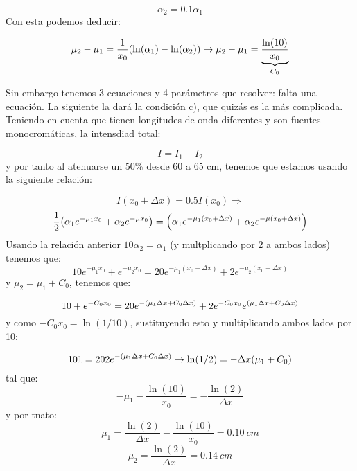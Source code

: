 \begin{equation}
    \alpha_2 = 0.1 \alpha_1
\end{equation}
Con esta podemos deducir: 

\begin{equation}
    \mu_2 - \mu_1 = \frac{1}{x_0} \pqty{\ln(\alpha_1)-\ln(\alpha_2)} \to \mu_2 - \mu_1 = \underbrace{\frac{\ln(10)}{x_0}}_{C_0}
\end{equation}

Sin embargo tenemos 3 ecuaciones y 4 parámetros que resolver: falta una ecuación. La siguiente la dará la condición c), que quizás es la más complicada. Teniendo en cuenta que tienen longitudes de onda diferentes y son fuentes monocromáticas, la intensdiad total: 

\begin{equation}
    I = I_1 + I_2 
\end{equation}
y por tanto al atenuarse un 50\% desde 60 a 65 cm, tenemos que estamos usando la siguiente relación: 

\begin{equation}
    I(x_0+\Delta x) = 0.5 I(x_0)  \Longrightarrow
\end{equation} 
\begin{equation}
    \frac{1}{2} \pqty{\alpha_1 e^{-\mu_1 x_0} + \alpha_2 e^{-\mu x_0}} = \pqty{\alpha_1 e^{-\mu_1 (x_0+\Delta x)} + \alpha_2 e^{-\mu (x_0+\Delta x)}}
\end{equation}
Usando la relación anterior  $10\alpha_2 = \alpha_1$ (y multplicando por 2 a ambos lados) tenemos que:
\begin{equation} 
    10e^{-\mu_1 x_0} + e^{-\mu_2 x_0} = 20 e^{-\mu_1 (x_0+\Delta x)} +2 e^{-\mu_2 (x_0+\Delta x)}
\end{equation}
y $\mu_2 = \mu_1 + C_0$, tenemos que: 

\begin{equation}
    10 + e^{-C_0 x_0} = 20 e^{-\pqty{\mu_1\Delta x+C_0 \Delta x}} +2 e^{-C_0x_0} e^{\pqty{\mu_1\Delta x+C_0 \Delta x}}
\end{equation}
y como $-C_0x_0=\ln(1/10)$, sustituyendo esto y multiplicando ambos lados por 10: 

\begin{equation}
    101 = 202 e^{-\pqty{\mu_1\Delta x+C_0 \Delta x}}  \to \ln(1/2) = - \Delta x (\mu_1 + C_0) 
\end{equation}
tal que:
\begin{equation}
    -\mu_1 -  \frac{\ln(10)}{x_0}= -\frac{\ln(2)}{\Delta x}
\end{equation}
y por tnato: 
\begin{equation}
    \mu_1 =\frac{\ln(2)}{\Delta x} - \frac{\ln(10)}{x_0} = 0.10 \ \unit{cm}
\end{equation}
\begin{equation}
    \mu_2 = \frac{\ln(2)}{\Delta x} = 0.14  \ \unit{cm}
\end{equation}

